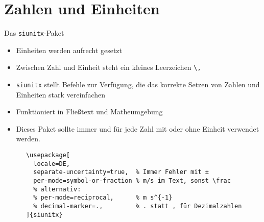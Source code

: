 \section{Zahlen und Einheiten}

\begin{frame}[fragile]{
  Das \texttt{siunitx}-Paket
  \hfill{}
}
\begin{itemize}
    \item Einheiten werden aufrecht gesetzt
    \item Zwischen Zahl und Einheit steht ein kleines Leerzeichen \lstinline+\,+
    \item \texttt{siunitx} stellt Befehle zur Verfügung, die das korrekte Setzen von Zahlen und Einheiten stark vereinfachen
    \item Funktioniert in Fließtext und Matheumgebung
    \item[$\color{vertexDarkRed}\Rightarrow$] Dieses Paket sollte \alert{immer} und für \alert{jede} Zahl mit oder ohne Einheit verwendet werden.
\end{itemize}
  \begin{Packages}
    \begin{lstlisting}
      \usepackage[
        locale=DE,
        separate-uncertainty=true,  % Immer Fehler mit ±
        per-mode=symbol-or-fraction % m/s im Text, sonst \frac
        % alternativ:
        % per-mode=reciprocal,      % m s^{-1}
        % decimal-marker=.,         % . statt , für Dezimalzahlen
      ]{siunitx}
    \end{lstlisting}
  \end{Packages}
\end{frame}

